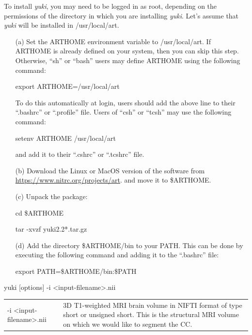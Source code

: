 \documentclass[11pt]{article}
\begin{document}
To install {\it yuki}, you may need 
to be logged in as root, depending on the permissions of the directory in which
you are installing {\it yuki}. Let's assume that {\it yuki} will be installed in
/usr/local/art.
\begin{itemize}
\item[(a)] Set the ARTHOME environment variable to /usr/local/art. If ARTHOME is already
defined on your system, then you can skip this step. Otherwise, ``sh'' or ``bash'' 
users may define ARTHOME using the following command: 

export ARTHOME=/usr/local/art 

To do this automatically at login, users should add the above line to their 
``.bashrc'' or ``.profile'' file. 
Users of ``csh'' or ``tcsh'' may use the following command:

setenv ARTHOME /usr/local/art 

and add it to their ``.cshrc'' or ``.tcshrc'' file.

\item[(b)] Download the Linux or MacOS version of the software from 
\href{https://www.nitrc.org/projects/art}{https://www.nitrc.org/projects/art}.
and move it to \$ARTHOME.

\item[(c)] Unpack the package:

cd \$ARTHOME

tar -xvzf yuki2.2*.tar.gz

\item[(d)] Add the directory \$ARTHOME/bin to your PATH. This can be done by executing the
following command and adding it to the ``.bashrc'' file:

export PATH=\$ARTHOME/bin:\$PATH

\end{itemize}


yuki [options] -i \textless input-filename\textgreater.nii


\begin{longtable}{p{}p{}}
-i \textless input-filename\textgreater.nii &
3D T1-weighted MRI brain volume in NIFTI format of type short or unsigned short.
This is the structural MRI volume on which we would like to segment the CC.
\end{longtable}

\end{document}
